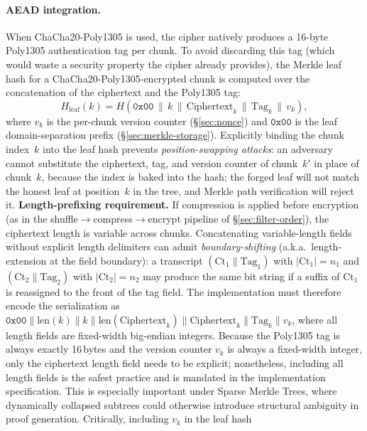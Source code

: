 \documentclass[11pt]{article}
\begin{document}
\paragraph{AEAD integration.}
When ChaCha20-Poly1305 is used, the cipher natively produces a 16-byte
Poly1305 authentication tag per chunk. To avoid discarding this tag (which
would waste a security property the cipher already provides), the Merkle leaf
hash for a ChaCha20-Poly1305-encrypted chunk is computed over the
concatenation of the ciphertext and the Poly1305 tag:
\begin{equation}
  H_\text{leaf}(k) = H(\texttt{0x00} \,\|\, k \,\|\,
                        \text{Ciphertext}_k \,\|\, \text{Tag}_k \,\|\, v_k),
\end{equation}
where $v_k$ is the per-chunk version counter (\S\ref{sec:nonce}) and
$\texttt{0x00}$ is the leaf domain-separation prefix (\S\ref{sec:merkle-storage}).
Explicitly binding the chunk index~$k$ into the leaf hash prevents
\emph{position-swapping attacks}: an adversary cannot substitute the
ciphertext, tag, and version counter of chunk~$k'$ in place of chunk~$k$,
because the index is baked into the hash; the forged leaf will not match
the honest leaf at position~$k$ in the tree, and Merkle path verification
will reject it.
\textbf{Length-prefixing requirement.}  If compression is applied before
encryption (as in the shuffle$\to$compress$\to$encrypt pipeline of
\S\ref{sec:filter-order}), the ciphertext length is variable across chunks.
Concatenating variable-length fields without explicit length delimiters
can admit \emph{boundary-shifting} (a.k.a.\ length-extension at the
field boundary): a transcript $(\text{Ct}_1 \| \text{Tag}_1)$ with
$|\text{Ct}_1| = n_1$ and $(\text{Ct}_2 \| \text{Tag}_2)$ with
$|\text{Ct}_2| = n_2$ may produce the same bit string if a suffix of
$\text{Ct}_1$ is reassigned to the front of the tag field.  The
implementation must therefore encode the serialization as
$\texttt{0x00} \| \text{len}(k) \| k \| \text{len}(\text{Ciphertext}_k) \|
\text{Ciphertext}_k \| \text{Tag}_k \| v_k$, where all length fields are
fixed-width big-endian integers.  Because the Poly1305 tag is always exactly
16\,bytes and the version counter $v_k$ is always a fixed-width integer, only
the ciphertext length field needs to be explicit; nonetheless, including all
length fields is the safest practice and is mandated in the implementation
specification. This is especially important under Sparse Merkle Trees,
where dynamically collapsed subtrees could otherwise introduce structural
ambiguity in proof generation. Critically, including $v_k$ in the leaf hash
\end{document}
